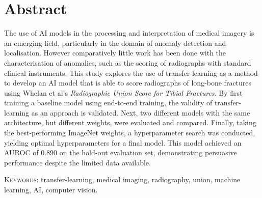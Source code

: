 \chapter{Abstract}

The use of AI models in the processing and interpretation of medical imagery is an emerging field, particularly in the domain of anomaly detection and localisation. However comparatively little work has been done with the characterisation of anomalies, such as the scoring of radiographs with standard clinical instruments. This study explores the use of transfer-learning as a method to develop an AI model that is able to score radiographs of long-bone fractures using Whelan et al's \emph{Radiographic Union Score for Tibial Fractures}. By first training a baseline model using end-to-end training, the validity of transfer-learning as an approach is validated. Next, two different models with the same architecture, but different weights, were evaluated and compared. Finally, taking the best-performing ImageNet weights, a hyperparameter search was conducted, yielding optimal hyperparameters for a final model. This model achieved an AUROC of \(0.890\) on the hold-out evaluation set, demonstrating persuasive performance despite the limited data available. 

\textsc{Keywords:} transfer-learning, medical imaging, radiography, union, machine learning, AI, computer vision.